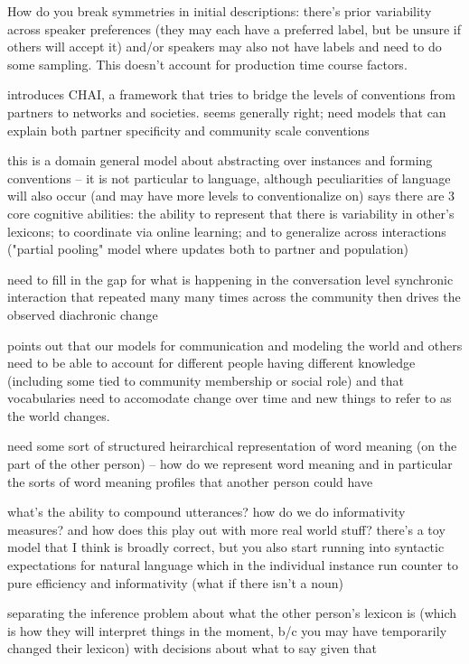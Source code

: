 \documentclass[]{article}
\begin{document}
\cite{hawkins2020b} How do you break symmetries in initial descriptions: there's prior variability across speaker preferences (they may each have a preferred label, but be unsure if others will accept it) and/or speakers may also not have labels and need to do some sampling. This doesn't account for production time course factors. 

\cite{hawkins2021} introduces CHAI, a framework that tries to bridge the levels of conventions from partners to networks and societies. seems generally right; need models that can explain both partner specificity and community scale conventions

this is a domain general model about abstracting over instances and forming conventions -- it is not particular to language, although peculiarities of language will also occur (and may have more levels to conventionalize on) 
\cite{hawkins2021} says there are 3 core cognitive abilities: the ability to represent that there is variability in other's lexicons; to coordinate via online learning; and to generalize across interactions ("partial pooling" model where updates both to partner and population) 

need to fill in the gap for what is happening in the conversation level synchronic interaction that repeated many many times across the community then drives the observed diachronic change 

\cite{hawkins2021} points out that our models for communication and modeling the world and others need to be able to account for different people having different knowledge (including some tied to community membership or social role) and that vocabularies need to accomodate change over time and new things to refer to as the world changes. 


need some sort of structured heirarchical representation of word meaning (on the part of the other person) -- how do we represent word meaning and in particular the sorts of word meaning profiles that another person could have 

what's the ability to compound utterances? how do we do informativity measures? and how does this play out with more real world stuff? there's a toy model that I think is broadly correct, but you also start running into syntactic expectations for natural language which in the individual instance run counter to pure efficiency and informativity (what if there isn't a noun) 

\cite{hawkins2021} separating the inference problem about what the other person's lexicon is (which is how they will interpret things in the moment, b/c you may have temporarily changed their lexicon) with decisions about what to say given that 
\end{document}
